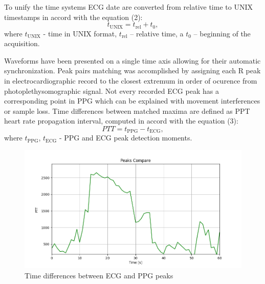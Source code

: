 \documentclass[journal]{IEEEtran}
\begin{document}
To unify the time systems ECG date are converted from relative time to UNIX timestamps in accord with the equation (2):
\begin{equation}
t_{\mathrm{UNIX}} = t_{\mathrm{rel}} + t_{0},
\end{equation}
where $t_{\mathrm{UNIX}}$ - time in UNIX format, $t_{\mathrm{rel}}$ – relative time, a $t_{0}$ – beginning of the acquisition.

Waveforms have been presented on a single time axis allowing for their automatic synchronization. Peak pairs matching was accomplished by assigning each R peak in electrocardiographic record to the closest extremum in order of ocurence from photoplethysomographic signal. Not every recorded ECG peak has a corresponding point in PPG which can be explained with movement interferences or sample loss. Time differences between matched maxima are defined as PPT heart rate propagation interval, computed in accord with the equation (3):
\begin{equation}
PTT = t_{\mathrm{PPG}} - t_{\mathrm{ECG}},
\end{equation}
where $t_{\mathrm{PPG}}$, $t_{\mathrm{ECG}}$ - PPG and ECG peak detection moments. 

\newpage
\begin{figure}[htbp]
    \centering
    \includegraphics[width=1.0\linewidth]{Peaks_compare.png}
   \caption{Time differences between ECG and PPG peaks}%
    \label{fig:PTT}
\end{figure}
\end{document}
